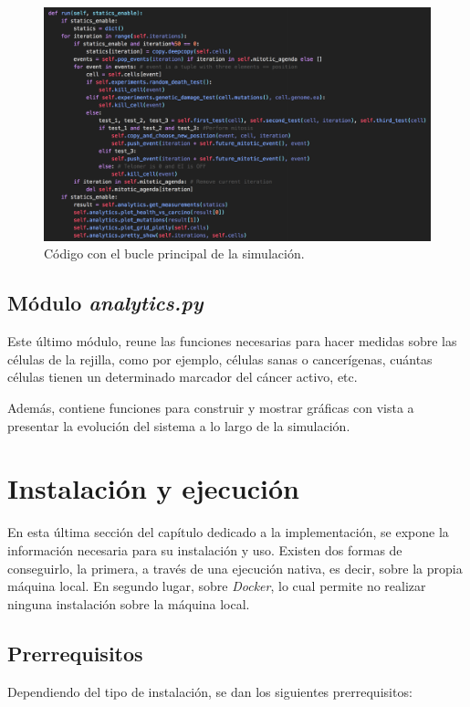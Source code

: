 \begin{figure}[h]
\centering
\includegraphics[scale=0.45]{figures/alg}
\caption{Código con el bucle principal de la simulación.}
\end{figure}

\subsection{Módulo \textit{analytics.py}}

Este último módulo, reune las funciones necesarias para hacer medidas sobre las células
de la rejilla, como por ejemplo, células sanas o cancerígenas, cuántas células tienen un
determinado marcador del cáncer activo, etc.

Además, contiene funciones para construir y mostrar gráficas con vista a presentar la evolución
del sistema a lo largo de la simulación.

\section{Instalación y ejecución}

En esta última sección del capítulo dedicado a la implementación, se expone la información necesaria
para su instalación y uso. Existen dos formas de conseguirlo, la primera, a través de una ejecución
nativa, es decir, sobre la propia máquina local. En segundo lugar, sobre \textit{Docker}, lo cual permite
no realizar ninguna instalación sobre la máquina local.

\subsection{Prerrequisitos}

Dependiendo del tipo de instalación, se dan los siguientes prerrequisitos:

